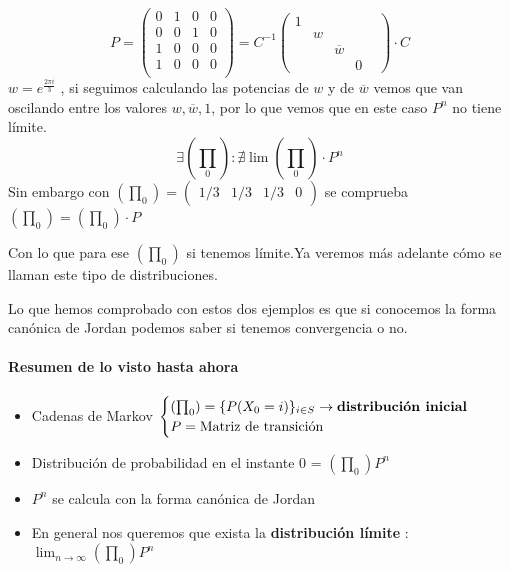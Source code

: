 \begin{example}[2]
	
	\begin{center}
		\centering
	\end{center}
	
	$$P = \left( \begin{matrix}
	0 & 1 & 0 & 0\\
	0 & 0 & 1 & 0\\
	1 & 0 & 0 & 0\\
	1 & 0 & 0 & 0\\
	\end{matrix}\right)= C^{-1} \left(\begin{matrix}
	1&&&&\\
	&w&&&\\
	&&\overline{w}&\\
	&&&0
	\end{matrix}
	\right)\cdot C$$
	$w = e^{\frac{2\pi i}{3}}$ , si seguimos calculando las potencias de $w$ y de $\overline{w}$ vemos que van oscilando entre los valores $w , \overline{w} , 1$, por lo que vemos que en este caso $P^n$ no tiene límite.
	$$\exists(\prod_0) : \nexists \lim (\prod_0)\cdot P^n$$
	Sin embargo con $(\prod_0) = (\begin{matrix}
	1/3&1/3&1/3&0
	\end{matrix}) $ se comprueba $(\prod_0) = (\prod_0)\cdot P$
	
	
	Con lo que para ese $(\prod_0)$ si tenemos límite.Ya veremos más adelante cómo se llaman este tipo de distribuciones.
\end{example}

Lo que hemos comprobado con estos dos ejemplos es que si conocemos la forma canónica de Jordan podemos saber si tenemos convergencia o no.

\paragraph{Resumen de lo visto hasta ahora}
\begin{itemize}
	\item Cadenas de Markov $\begin{cases}
	(\prod_0) = \{P(X_0 = i)\}_{i \in S} \rightarrow \text{\textbf{distribución inicial}}\\
	P = \text{Matriz de transición}
	\end{cases}$
	\item Distribución de probabilidad en el instante 0 = $(\prod_0)P^n$
	\item $P^n$ se calcula con la forma canónica de Jordan
	\item En general nos queremos que exista la \textbf{distribución límite} : $\lim_{n\rightarrow\infty} (\prod_0) P^n$
\end{itemize}

